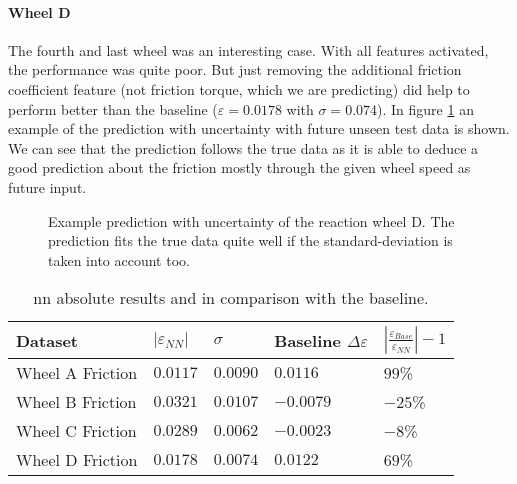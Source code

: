 		\paragraph*{Wheel D} \hfill
		
		The fourth and last wheel was an interesting case. With all features activated, the performance was quite poor. But just removing the additional friction coefficient feature (not friction torque, which we are predicting) did help to perform better than the baseline ($\varepsilon = 0.0178$ with $\sigma = 0.074$). \newline
		In figure \ref{f:rwd_prediction_example} an example of the prediction with uncertainty with future unseen test data is shown. We can see that the prediction follows the true data as it is able to deduce a good prediction about the friction mostly through the given wheel speed as future input.
		
		\begin{figure}[htb]
		\centering
		
		\caption{Example prediction with uncertainty of the reaction wheel D. The prediction fits the true data quite well if the standard-deviation is taken into account too.}
		\label{f:rwd_prediction_example}
		\end{figure}
			
		\begin{table}[htb]
		\centering
		\caption{\ac{nn} absolute results and in comparison with the baseline.}
		\begin{tabular}{b{}b{}b{}b{}b{}}
		\toprule
		Dataset				& $| \varepsilon_{NN} |$	& $\sigma$ 	& Baseline $\Delta\varepsilon$	& $\left| \frac{\varepsilon_{Base}}{\varepsilon_{NN}} \right| - 1$	\\ \midrule
		Wheel A Friction		& $\num{0.0117}$		& $\num{0.0090}$	& $\num{0.0116}$	& 	$\num{99}$\%	\\
		Wheel B Friction		& $\num{0.0321}$		& $\num{0.0107}$	& $\num{-0.0079}$	& $\num{-25}$\%	\\
		Wheel C Friction		& $\num{0.0289}$		& $\num{0.0062}$	& $\num{-0.0023}$	& $\num{-8}$\%	\\
		Wheel D Friction		& $\num{0.0178}$		& $\num{0.0074}$	& $\num{0.0122}$		& $\num{69}$\%	\\
		\bottomrule
		\end{tabular}
		\label{t:rwa_error}
		\end{table}		
			

